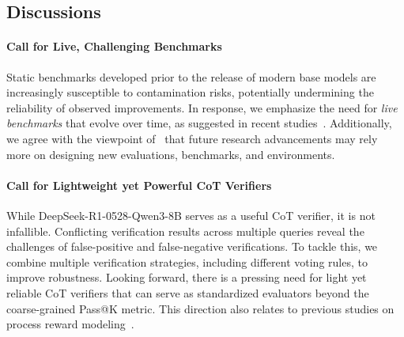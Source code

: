 \subsection{Discussions}
\label{supp_sec:discuss}


\paragraph{Call for Live, Challenging Benchmarks}
Static benchmarks developed prior to the release of modern base models are increasingly susceptible to contamination risks, potentially undermining the reliability of observed improvements. In response, we emphasize the need for \emph{live benchmarks} that evolve over time, as suggested in recent studies~\citep{Jain2025LiveCodeBench,white2025livebench}. Additionally, we agree with the viewpoint of~\citet{Yao2025SecondHalf} that future research advancements may rely more on designing new evaluations, benchmarks, and environments.

\paragraph{Call for Lightweight yet Powerful CoT Verifiers}
While DeepSeek-R1-0528-Qwen3-8B serves as a useful CoT verifier, it is not infallible. Conflicting verification results across multiple queries reveal the challenges of false-positive and false-negative verifications. To tackle this, we combine multiple verification strategies, including different voting rules, to improve robustness. Looking forward, there is a pressing need for light yet reliable CoT verifiers that can serve as standardized evaluators beyond the coarse-grained Pass@K metric. This direction also relates to previous studies on process reward modeling~\citep{lightman2023VerifyByStep,uesato2022ProcAndOutFeedback,wang2024MathShepherd}.

